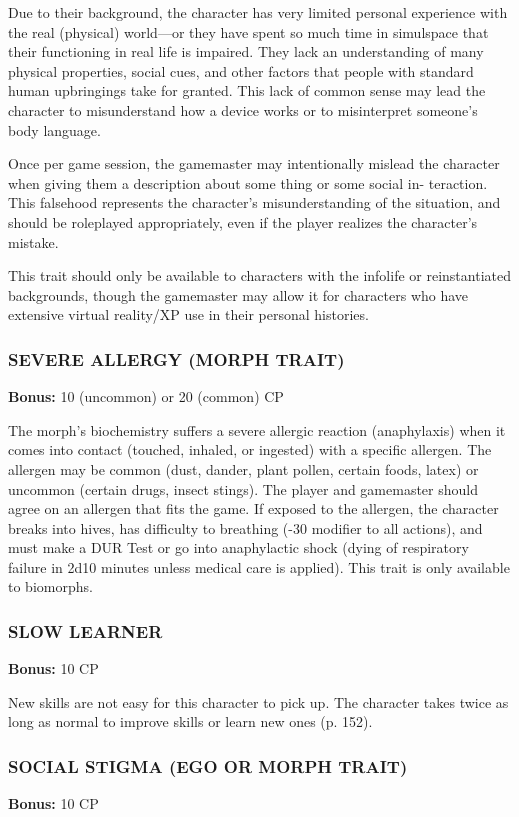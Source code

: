 Due to their background, the character has very limited personal experience
with the real (physical) world—or they have spent so much time in simulspace
that their functioning in real life is impaired.  They lack an understanding of
many physical properties, social cues, and other factors that people with
standard human upbringings take for granted. This lack of common sense may lead
the character to misunderstand how a device works or to misinterpret someone’s
body language.

Once per game session, the gamemaster may intentionally mislead the character
when giving them a description about some thing or some social in-
teraction. This falsehood represents the character’s misunderstanding of the
situation, and should be roleplayed appropriately, even if the player realizes
the character’s mistake.

This trait should only be available to characters with the infolife or
reinstantiated backgrounds, though the gamemaster may allow it for characters
who have extensive virtual reality/XP use in their personal histories.

\subsubsection{SEVERE ALLERGY (MORPH TRAIT)}
\textbf{Bonus:} 10 (uncommon) or 20 (common) CP

The morph’s biochemistry suffers a severe allergic reaction (anaphylaxis) when
it comes into contact (touched, inhaled, or ingested) with a specific allergen.
The allergen may be common (dust, dander, plant pollen, certain foods, latex)
or uncommon (certain drugs, insect stings). The player and gamemaster should
agree on an allergen that fits the game. If exposed to the allergen, the
character breaks into hives, has difficulty to breathing (-30 modifier to all
actions), and must make a DUR Test or go into anaphylactic shock (dying of
respiratory failure in 2d10 minutes unless medical care is applied).  This
trait is only available to biomorphs.

\subsubsection{SLOW LEARNER}
\textbf{Bonus:} 10 CP

New skills are not easy for this character to pick up. The character takes
twice as long as normal to improve skills or learn new ones (p. 152).

\subsubsection{SOCIAL STIGMA (EGO OR MORPH TRAIT)}
\textbf{Bonus:} 10 CP

